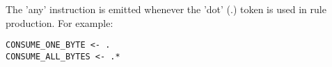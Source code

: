The 'any' instruction is emitted whenever the 'dot' (.) token is used
in rule production. For example:

\begin{myquote}
\begin{verbatim}
CONSUME_ONE_BYTE <- .
CONSUME_ALL_BYTES <- .*
\end{verbatim}
\end{myquote}

